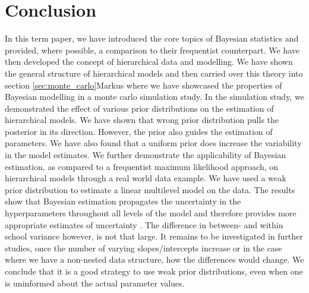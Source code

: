 \section{Conclusion}
In this term paper, we have introduced the core topics of Bayesian statistics and provided, where possible, a comparison to their frequentist counterpart. We have then developed the concept of hierarchical data and modelling. We have shown the general structure of hierarchical  models and then carried over this theory into section \ref{sec:monte_carlo}Markus where we have showcased the properties of Bayesian modelling in a monte carlo simulation study. In the simulation study, we demonstrated the effect of various prior distributions on the estimation of hierarchical models. We have shown that wrong prior distribution pulls the posterior in its direction. However, the prior also guides the estimation of parameters. We have also found that a uniform prior does increase the variability in the model estimates. 
We further demonstrate the applicability of Bayesian estimation, as compared to a frequentist maximum likelihood approach, on hierarchical models through a real world data example. We have used a weak prior distribution to estimate a linear multilevel model on the data.  The results show that Bayesian estimation propagates the uncertainty in the hyperparameters throughout all levels of the model and therefore provides more appropriate estimates of uncertainty \cite{browne2006comparison}. The difference in between- and within school variance however, is not that large. It remains to be investigated in further studies, once the number of varying slopes/intercepts increase or in the case where we have a non-nested data structure,  how the differences would change. We conclude that it is a good strategy to use weak prior distributions, even when one is uninformed about the actual parameter values. 

